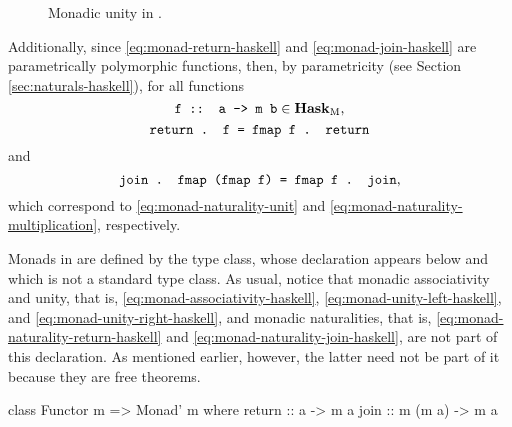 \begin{figure}[htb]
  \begin{center}
  \end{center}
  \caption{Monadic unity in \hask.}
  \label{fig:monad-unity-haskell}
\end{figure}

Additionally, since 
\eqref{eq:monad-return-haskell} and 
\eqref{eq:monad-join-haskell} are parametrically polymorphic
functions, then, by parametricity (see Section
\ref{sec:naturals-haskell}), for all functions
\begin{equation*}
  \text{\texttt{f :: a -> m b}} \in \mathcal{\mathbf{Hask}}_{\operatorname{M}}
  \text{,}
\end{equation*}
\begin{equation}
  \label{eq:monad-naturality-return-haskell}
  \text{\texttt{return . f = fmap f . return}}
\end{equation}
and
\begin{equation}
  \label{eq:monad-naturality-join-haskell}
  \text{\texttt{join . fmap (fmap f) = fmap f . join}}
  \text{,}
\end{equation}
which correspond to \eqref{eq:monad-naturality-unit} and
\eqref{eq:monad-naturality-multiplication}, respectively.

Monads in \hask are defined by the  type class,
whose declaration appears below and which is not a standard type class. As usual,
notice that monadic associativity and unity, that is,
\eqref{eq:monad-associativity-haskell},
\eqref{eq:monad-unity-left-haskell}, and
\eqref{eq:monad-unity-right-haskell}, and monadic naturalities, that
is, \eqref{eq:monad-naturality-return-haskell} and
\eqref{eq:monad-naturality-join-haskell}, are not part of this
declaration. As mentioned earlier, however, the latter need not be
part of it because they are free theorems.
\begin{codehaskell}
class Functor m => Monad' m where
  return :: a -> m a
  join   :: m (m a) -> m a
\end{codehaskell}


